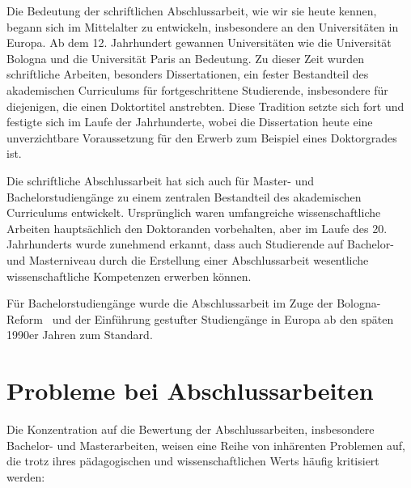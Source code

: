 \documentclass[conference]{IEEEtran}
\begin{document}
Die Bedeutung der schriftlichen Abschlussarbeit, wie wir sie heute kennen, begann sich im Mittelalter zu entwickeln, insbesondere an den Universitäten in Europa. Ab dem 12. Jahrhundert gewannen Universitäten wie die Universität Bologna und die Universität Paris an Bedeutung. Zu dieser Zeit wurden schriftliche Arbeiten, besonders Dissertationen, ein fester Bestandteil des akademischen Curriculums für fortgeschrittene Studierende, insbesondere für diejenigen, die einen Doktortitel anstrebten. Diese Tradition setzte sich fort und festigte sich im Laufe der Jahrhunderte, wobei die Dissertation heute eine unverzichtbare Voraussetzung für den Erwerb zum Beispiel eines Doktorgrades ist.~\cite{hps_medieval_universities}

Die schriftliche Abschlussarbeit hat sich auch für Master- und Bachelorstudiengänge zu einem zentralen Bestandteil des akademischen Curriculums entwickelt. Ursprünglich waren umfangreiche wissenschaftliche Arbeiten hauptsächlich den Doktoranden vorbehalten, aber im Laufe des 20. Jahrhunderts wurde zunehmend erkannt, dass auch Studierende auf Bachelor- und Masterniveau durch die Erstellung einer Abschlussarbeit wesentliche wissenschaftliche Kompetenzen erwerben können.

Für Bachelorstudiengänge wurde die Abschlussarbeit im Zuge der Bologna-Reform~\cite{terry2008bologna} und der Einführung gestufter Studiengänge in Europa ab den späten 1990er Jahren zum Standard.

\section{Probleme bei Abschlussarbeiten}

Die Konzentration auf die Bewertung der Abschlussarbeiten, insbesondere Bachelor- und Masterarbeiten, weisen eine Reihe von inhärenten Problemen auf, die trotz ihres pädagogischen und wissenschaftlichen Werts häufig kritisiert werden:
\end{document}
